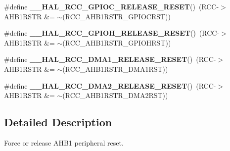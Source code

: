 \begin{DoxyCompactItemize}
\item 
\mbox{\label{group___r_c_c___a_h_b1___force___release___reset_ga1df0e3536d3450435bdccdbe9c878736}} 
\#define {\bfseries \+\_\+\+\_\+\+H\+A\+L\+\_\+\+R\+C\+C\+\_\+\+G\+P\+I\+O\+C\+\_\+\+R\+E\+L\+E\+A\+S\+E\+\_\+\+R\+E\+S\+ET}()~(R\+CC-\/$>$A\+H\+B1\+R\+S\+TR \&= $\sim$(R\+C\+C\+\_\+\+A\+H\+B1\+R\+S\+T\+R\+\_\+\+G\+P\+I\+O\+C\+R\+ST))
\item 
\mbox{\label{group___r_c_c___a_h_b1___force___release___reset_gaaf11aa8bacb98c4e567bbaa58635acec}} 
\#define {\bfseries \+\_\+\+\_\+\+H\+A\+L\+\_\+\+R\+C\+C\+\_\+\+G\+P\+I\+O\+H\+\_\+\+R\+E\+L\+E\+A\+S\+E\+\_\+\+R\+E\+S\+ET}()~(R\+CC-\/$>$A\+H\+B1\+R\+S\+TR \&= $\sim$(R\+C\+C\+\_\+\+A\+H\+B1\+R\+S\+T\+R\+\_\+\+G\+P\+I\+O\+H\+R\+ST))
\item 
\mbox{\label{group___r_c_c___a_h_b1___force___release___reset_ga8f7eef8316c35175df11d77f5106d334}} 
\#define {\bfseries \+\_\+\+\_\+\+H\+A\+L\+\_\+\+R\+C\+C\+\_\+\+D\+M\+A1\+\_\+\+R\+E\+L\+E\+A\+S\+E\+\_\+\+R\+E\+S\+ET}()~(R\+CC-\/$>$A\+H\+B1\+R\+S\+TR \&= $\sim$(R\+C\+C\+\_\+\+A\+H\+B1\+R\+S\+T\+R\+\_\+\+D\+M\+A1\+R\+ST))
\item 
\mbox{\label{group___r_c_c___a_h_b1___force___release___reset_gab7d22b3d82cd2616c8e3fa930e437757}} 
\#define {\bfseries \+\_\+\+\_\+\+H\+A\+L\+\_\+\+R\+C\+C\+\_\+\+D\+M\+A2\+\_\+\+R\+E\+L\+E\+A\+S\+E\+\_\+\+R\+E\+S\+ET}()~(R\+CC-\/$>$A\+H\+B1\+R\+S\+TR \&= $\sim$(R\+C\+C\+\_\+\+A\+H\+B1\+R\+S\+T\+R\+\_\+\+D\+M\+A2\+R\+ST))
\end{DoxyCompactItemize}


\subsection{Detailed Description}
Force or release A\+H\+B1 peripheral reset. 

